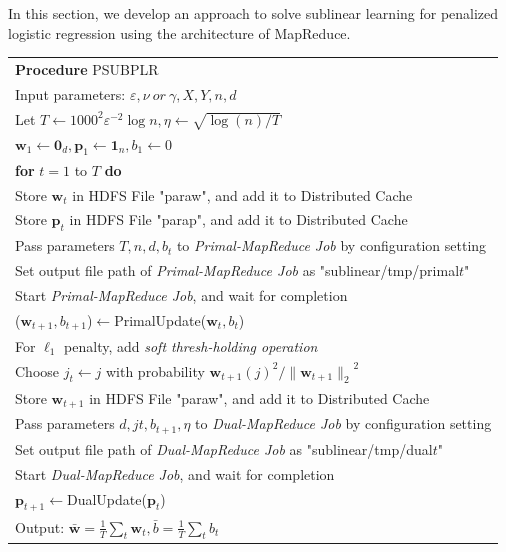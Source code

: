 \documentclass{llncs}
\newcommand{\bw}{\mathbf{w}}
\newcommand{\bp}{\mathbf{p}}
\newcommand{\lc}{\left(}
\newcommand{\rc}{\right)}
\newcommand{\lj}{\lc j\rc}
\newcommand{\tspace}{\hspace*{2em}}
\begin{document}
In this section, we develop an approach to solve sublinear learning for penalized logistic regression using the architecture of MapReduce.

	\begin{table}[ht]
	\begin{tabular}{l}
	\hline\noalign{\smallskip}
	\textbf{Procedure} PSUBPLR \\
	\noalign{\smallskip}
	\hline
	\noalign{\smallskip}
        Input parameters: $\varepsilon, \nu~or~\gamma, X, Y, n, d$ \\
        Let $T\leftarrow{1000}^{2}{\varepsilon}^{-2}\log n, \eta\leftarrow\sqrt{\log\lc n\rc/T}$ \\
        \hspace*{1.5em} ${\bw}_{1}\leftarrow{\mathbf{0}}_{d}, {\mathbf{\bp}}_{1}\leftarrow{\mathbf{1}}_{n}, {b}_{1}\leftarrow 0$\\
		\textbf{for} $t=1$ to $T$ \textbf{do} \\
        \tspace Store $\bw_t$ in HDFS File "paraw", and add it to Distributed Cache \\
        \tspace Store $\bp_t$  in HDFS File "parap", and add it to Distributed Cache \\
		\tspace Pass parameters $T, n, d, b_t$ to \textit{Primal-MapReduce Job} by configuration setting \\
        \tspace Set output file path of \textit{Primal-MapReduce Job} as "sublinear/tmp/primal$t$" \\
        \tspace Start \textit{Primal-MapReduce Job}, and wait for completion \\
        \tspace ($\bw_{t+1}, b_{t+1}$)$\leftarrow$PrimalUpdate($\bw_t, b_t$) \\
        \tspace For $\ell_1$ penalty, add \textit{soft thresh-holding operation} \\
        \tspace Choose $j_t \leftarrow j$ with probability ${{\bw}_{t+1}\lj}^{2}/{\|{\bw}_{t+1}\|_2}^{2} $ \\
        \tspace Store $\bw_{t+1}$ in HDFS File "paraw", and add it to Distributed Cache \\
		\tspace Pass parameters $d, jt, b_{t+1}, \eta$ to \textit{Dual-MapReduce Job} by configuration setting \\
        \tspace Set output file path of \textit{Dual-MapReduce Job} as "sublinear/tmp/dual$t$" \\
        \tspace Start \textit{Dual-MapReduce Job}, and wait for completion \\
        \tspace $\bp_{t+1}$$\leftarrow$DualUpdate($\bp_t$) \\
        Output: $\bar{\bw}=\frac{1}{T}\sum_{t}{\bw}_{t},\bar{b}=\frac{1}{T}\sum_{t}{b}_{t}$ \\
	\hline
	\end{tabular}
	\end{table}
\end{document}
